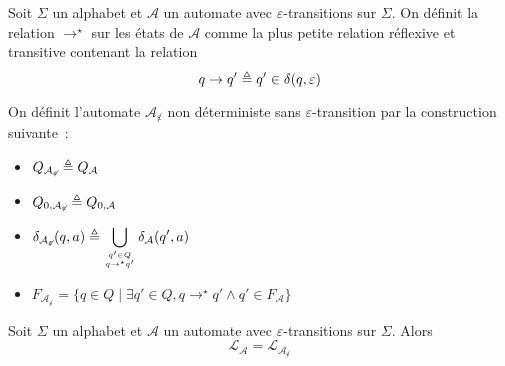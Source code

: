 \begin{definition}
  Soit $\Sigma$ un alphabet et $\mathcal A$ un automate avec
  $\varepsilon$-transitions sur $\Sigma$. On définit la relation $\to^\star$ sur
  les états de $\mathcal A$ comme la plus petite relation  réflexive et
  transitive contenant la relation
  \[q\to q' \triangleq q' \in \delta(q,\varepsilon)\]

  On définit l'automate $\mathcal A_{\not\varepsilon}$ non déterministe sans
  $\varepsilon$-transition par la construction suivante~:
  \begin{itemize}
  \item $Q_{\mathcal A_{\not\varepsilon}} \triangleq Q_\mathcal A$
  \item $Q_{0,\mathcal A_{\not\varepsilon}} \triangleq Q_{0,\mathcal A}$
  \item $\displaystyle\delta_{\mathcal A_{\not\varepsilon}}(q,a) \triangleq
    \bigcup_{{q' \in Q}\atop{q\to^\star q'}} \delta_{\mathcal A}(q',a)$
  \item $F_{\mathcal A_{\not\varepsilon}} =\{q \in Q
    \mid \exists q' \in Q, q \to^\star q' \land q' \in F_\mathcal A\}$
  \end{itemize}
\end{definition}

\begin{proposition}
  Soit $\Sigma$ un alphabet et $\mathcal A$ un automate avec
  $\varepsilon$-transitions sur $\Sigma$. Alors
  \[\mathcal L_{\mathcal A} = \mathcal L_{\mathcal A_{\not\varepsilon}}\]
\end{proposition}

